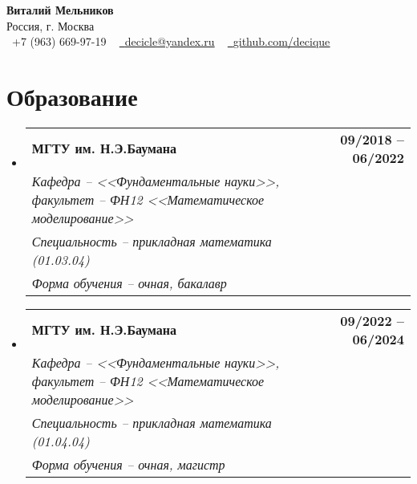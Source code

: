\documentclass[letterpaper,11pt]{article}
\makeatletter
\newcommand{\resumeSubheadingEdu}[8]{
  \vspace{-2pt}\item
    \begin{tabular*}{1.0\textwidth}[t]{l@{\extracolsep{\fill}}r}
      \textbf{#1} & \textbf{\small #2} \\
      \textit{\small#3} & \textit{\small #4} \\
      \textit{\small#5} & \textit{\small #6} \\
      \textit{\small#7} & \textit{\small #8} \\
    \end{tabular*}\vspace{-7pt}
}
\newcommand{\resumeSubHeadingListStart}{\begin{itemize}[leftmargin=0.0in, label={}]}
\newcommand{\resumeSubHeadingListEnd}{\end{itemize}}
\makeatother
\begin{document}

\begin{center}
    \textbf{\huge  Виталий Мельников} \\ \vspace{3pt}
   Россия, г. Москва \\ \vspace{3pt}
    \small \raisebox{-0.1\height}\faPhone\ +7 (963) 669-97-19 ~ \href{mailto:decicle@yandex.ru}{\raisebox{-0.2\height}\faEnvelope\  \underline{decicle@yandex.ru}} ~ 
    \href{https://github.com/decique}{\raisebox{-0.2\height}\faGithub\ \underline{github.com/decique}}
    \vspace{5pt}
\end{center}


\section{Образование}
  \resumeSubHeadingListStart
    \resumeSubheadingEdu
      {МГТУ им. Н.Э.Баумана}{09/2018 -- 06/2022}
      {Кафедра -- <<Фундаментальные науки>>, факультет -- ФН12 <<Математическое моделирование>>}{}
      {Специальность -- прикладная математика (01.03.04)}{}
      {Форма обучения -- очная, бакалавр}{}
      \vspace{3pt}
    \resumeSubheadingEdu
      {МГТУ им. Н.Э.Баумана}{09/2022 -- 06/2024}
      {Кафедра -- <<Фундаментальные науки>>, факультет -- ФН12 <<Математическое моделирование>>}{}
      {Специальность -- прикладная математика (01.04.04)}{}
      {Форма обучения -- очная, магистр}{}
    
  \resumeSubHeadingListEnd

%
\end{document}
